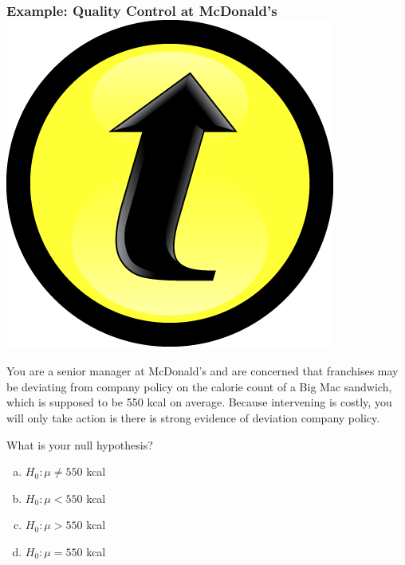 \documentclass[handout]{beamer}
\begin{document}
\begin{frame}
\frametitle{Example: Quality Control at McDonald's \hfill \includegraphics[scale = 0.05]{./images/clicker}}

You are a senior manager at McDonald's and are concerned that franchises may be deviating from company policy on the calorie count of a Big Mac sandwich, which is supposed to be 550 kcal on average. Because intervening is costly, you will only take action is there is strong evidence of deviation company policy. \\

\vspace{1em}

\alert{What is your null hypothesis?}
	\begin{enumerate}[(a)]
		\item $H_0\colon \mu \neq 550$ kcal
		\item $H_0\colon \mu < 550$ kcal
		\item $H_0\colon \mu > 550$ kcal
		\item $H_0\colon \mu = 550$ kcal
\end{enumerate}
\end{frame}
\end{document}
